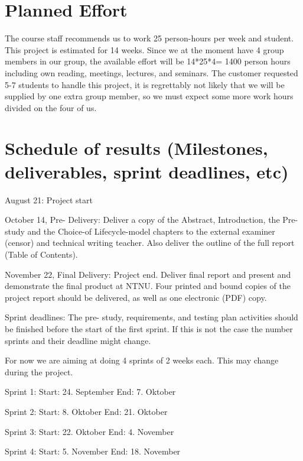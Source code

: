 \section{Planned Effort}
The course staff recommends us to work 25 person-hours per week and student. This project is estimated for 14 weeks. Since we at the moment have 4 group members in our group, the available effort will be 14*25*4= 1400 person hours including own reading, meetings, lectures, and seminars. The customer requested 5-7 students to handle this project, it is regrettably not likely that we will be supplied by one extra group member, so we must expect some more work hours divided on the four of us.

\section{Schedule of results (Milestones, deliverables, sprint deadlines, etc)}
August 21: Project start

October 14, Pre- Delivery: Deliver a copy of the Abstract, Introduction, the Pre-study and the Choice-of Lifecycle-model chapters to the external examiner (censor) and technical writing teacher. Also deliver the outline of the full report (Table of  Contents).

November 22, Final Delivery: Project end. Deliver final report and present and demonstrate the final product at NTNU. Four printed and bound copies of  the project report should be delivered, as well as one electronic (PDF) copy.

Sprint deadlines:
The pre- study, requirements, and testing plan activities should be finished before the start of the first sprint. If this is not the case the number sprints and their deadline might change.

For now we are aiming at doing 4 sprints of 2 weeks each. This may change during the project.

Sprint 1: 
Start: 24. September
End: 7. Oktober

Sprint 2:
Start: 8. Oktober
End: 21. Oktober

Sprint 3:
Start: 22. Oktober
End: 4. November

Sprint 4:
Start: 5. November
End: 18. November

